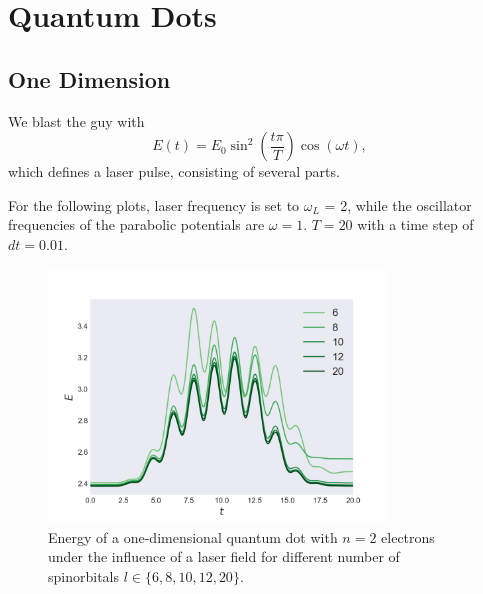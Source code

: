 \chapter{Quantum Dots}

\section{One Dimension}

We blast the guy with 
\begin{equation}
    E(t) = E_0\sin^2\left(\frac{t\pi}{T}\right)\cos(\omega t),
\end{equation}
which defines a laser pulse, consisting of several parts. 

For the following plots, laser frequency is set to $\omega_L$ = 2, while the 
oscillator frequencies of the parabolic potentials are $\omega = 1$. $T=20$ with 
a time step of $dt=0.01$.

\begin{figure}
    \centering
    \includegraphics[width=0.8\textwidth]{results/figures/1D/n=2energy.png} 
    \caption{Energy of a one-dimensional quantum dot with $n=2$ electrons
        under the influence of a laser field for different number of spinorbitals
        $l\in\{6,8,10,12,20\}$.
    }
    \label{fig:1d_n2_E}
\end{figure}

